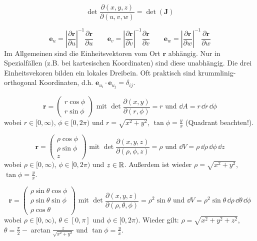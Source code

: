 \begin{frameddefn}[Funktionaldeterminante]
\[	
\det \frac{\partial (x,y,z)}{\partial (u,v,w)} = \det(\mathbf{J})
\]
\end{frameddefn}

\begin{framedprop}
\[
\mathbf{e}_u = \left| \frac{\partial \mathbf{r}}{\partial u} \right|^{-1} \frac{\partial \mathbf{r}}{\partial u} \qquad
 \mathbf{e}_v = \left| \frac{\partial \mathbf{r}}{\partial v} \right|^{-1} \frac{\partial \mathbf{r}}{\partial v} \qquad
 \mathbf{e}_w = \left| \frac{\partial \mathbf{r}}{\partial w} \right|^{-1} \frac{\partial \mathbf{r}}{\partial w}
\]
Im Allgemeinen sind die Einheitsvektoren vom Ort $\mathbf{r}$ abhängig. Nur in Spezialfällen (z.B. bei kartesischen Koordinaten) sind diese unabhängig. Die drei Einheitsvekoren bilden ein lokales Dreibein. Oft praktisch sind krummlinig-orthogonal Koordinaten, d.h. $\mathbf{e}_{u_{i}} \cdot \mathbf{e}_{u_{j}} = \delta_{ij}$.
\end{framedprop}

\begin{frameddefn}[Polarkoordinaten]
\[
\mathbf{r} = \left(\begin{array}{c} r \cos\phi \\ r \sin\phi \end{array} \right) \textrm{ mit } \det \frac{\partial (x,y)}{\partial (r, \phi)} = r \textrm{ und } \dd A = r \, \dd r \, \dd \phi
\]
wobei $r \in [0, \infty)$, $\phi \in [0,2\pi)$ und $r = \sqrt{x^2 + y^2}$, $\tan\phi = \frac{y}{x}$ (Quadrant beachten!).
\end{frameddefn}

\begin{frameddefn}[Zylinderkoordinaten]
\[
\mathbf{r} = \left(\begin{array}{c} \rho \cos\phi \\ \rho \sin\phi \\ z \end{array} \right) \textrm{ mit } \det \frac{\partial (x,y,z)}{\partial (\rho, \phi, z)} = \rho \textrm{ und } \dd V = \rho \, \dd \rho \, \dd \phi \, \dd z
\]
wobei $\rho \in [0, \infty)$, $\phi \in [0,2\pi)$ und $z \in \mathbb{R}$. Außerdem ist wieder $\rho = \sqrt{x^2 + y^2}$, $\tan\phi = \frac{y}{x}$.	
\end{frameddefn}

\begin{frameddefn}[Kugelkoordinaten]
\[
\mathbf{r} = \left(\begin{array}{c} \rho \sin\theta \cos\phi \\ \rho \sin\theta \sin\phi \\ \rho \cos\theta \end{array} \right) \textrm{ mit } \det \frac{\partial (x,y,z)}{\partial (\rho, \theta, \phi)} = \rho^2 \sin\theta \textrm{ und } \dd V = \rho^2 \sin\theta \, \dd \rho \, \dd \theta \, \dd \phi
\]
wobei $\rho \in [0, \infty)$, $\theta \in [0,\pi]$ und $\phi \in [0,2\pi)$. Wieder gilt: $\rho = \sqrt{x^2+y^2+z^2}$, $\theta = \frac{\pi}{2} - \arctan\frac{z}{\sqrt{x^2+y^2}}$ und $\tan\phi = \frac{y}{x}$.	
\end{frameddefn}

